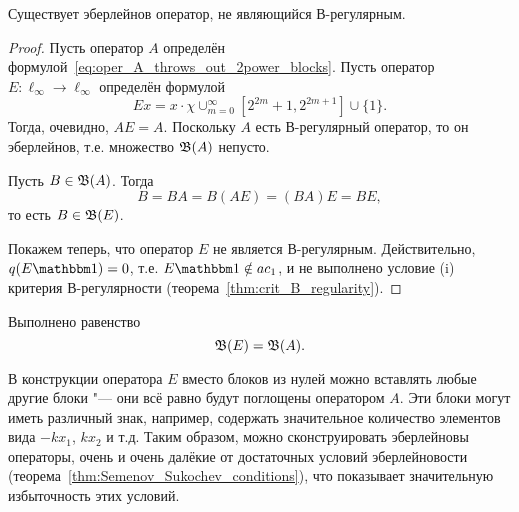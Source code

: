 \begin{theorem}
	\label{thm:Eberlein_but_not_B-regular_exists}
	Существует эберлейнов оператор, не являющийся В-регулярным.
\end{theorem}

\begin{proof}
	Пусть оператор $A$ определён формулой~\eqref{eq:oper_A_throws_out_2power_blocks}.
	Пусть оператор $E:\ell_\infty\to\ell_\infty$ определён формулой
	\begin{equation}
		Ex = x \cdot \chi{\cup_{m=0}^{\infty}\left[2^{2 m}+1, 2^{2 m+1}\right] \cup\{1\}}
		.
	\end{equation}
	Тогда, очевидно, $AE=A$.
	Поскольку $A$ есть В-регулярный оператор, то он эберлейнов,
	т.е. множество $\mathfrak{B}(A)$ непусто.

	Пусть $B\in\mathfrak{B}(A)$. Тогда
	\begin{equation}
		B = BA = B(AE) = (BA)E = BE
		,
	\end{equation}
	то есть $B\in\mathfrak{B}(E)$.

	Покажем теперь, что оператор $E$ не является В-регулярным.
	Действительно, $q(E\one) =0$, т.е. $ E\one \notin ac_1$,
	и не выполнено условие (i) критерия В-регулярности (теорема~\ref{thm:crit_B_regularity}).
\end{proof}

\begin{hypothesis}
	Выполнено равенство
	\begin{equation}
		\mathfrak{B}(E) = \mathfrak{B}(A)
		.
	\end{equation}
\end{hypothesis}

\begin{remark}
	В конструкции оператора $E$ вместо блоков из нулей можно вставлять любые другие блоки "---
	они всё равно будут поглощены оператором $A$.
	Эти блоки могут иметь различный знак, например, содержать значительное количество
	элементов вида $-kx_1$, $kx_2$ и т.д.
	Таким образом, можно сконструировать эберлейновы операторы, очень и очень далёкие
	от достаточных условий эберлейновости (теорема~\ref{thm:Semenov_Sukochev_conditions}),
	что показывает значительную избыточность этих условий.
\end{remark}
